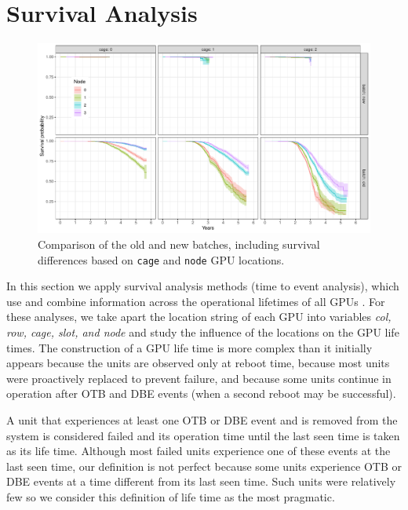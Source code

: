 \section{Survival Analysis}
\label{section:survival}
\renewcommand{\pkg}[1]{\textsf{#1}}
\begin{figure}
  \centering
  \includegraphics[width=7in]{figs/km_cage-node_a001.pdf}
  \caption{Comparison of the old and new batches, including survival
    differences based on {\tt cage} and {\tt node} GPU locations.}
  \label{fig:km-all-cage-node}
\end{figure}
In this section we apply survival analysis methods (time to event
analysis), which use and combine information across the operational
lifetimes of all GPUs \cite{survival}. For these analyses, we take
apart the location string of each GPU into variables {\em col, row,
  cage, slot, and node} and study the influence of the locations on
the GPU life times. The construction of a GPU life time is more
complex than it initially appears because the units are observed only
at reboot time, because most units were proactively replaced to
prevent failure, and because some units continue in operation after
OTB and DBE events (when a second reboot may be successful).

A unit that experiences at least one OTB or DBE event and is removed
from the system is considered failed and its operation time until the
last seen time is taken as its life time. Although most failed units
experience one of these events at the last seen time, our definition
is not perfect because some units experience OTB or DBE events at a
time different from its last seen time. Such units were relatively few
so we consider this definition of life time as the most pragmatic.

